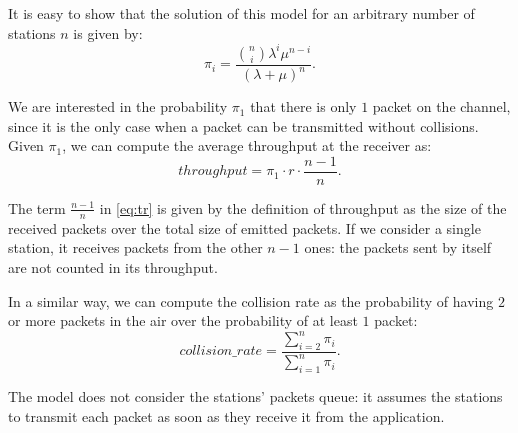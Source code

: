 It is easy to show that the solution of this model for an arbitrary number of stations $n$ is given by:
\begin{equation*}
    \pi_i = \frac{\binom{n}{i} \lambda^i \mu^{n-i}}{(\lambda + \mu)^n}.
\end{equation*}

We are interested in the probability $\pi_1$ that there is only $1$ packet on the channel, since it is the only case when a packet can be transmitted without collisions.
Given $\pi_1$, we can compute the average throughput at the receiver as:
\begin{equation}
    throughput = \pi_1 \cdot r \cdot \frac{n-1}{n}.
    \label{eq:tr}
\end{equation}

The term $\frac{n-1}{n}$ in \cref{eq:tr} is given by the definition of throughput as the size of the received packets over the total size of emitted packets.
If we consider a single station, it receives packets from the other $n-1$ ones: the packets sent by itself are not counted in its throughput.

In a similar way, we can compute the collision rate as the probability of having $2$ or more packets in the air over the probability of at least $1$ packet:
\begin{equation}
    collision\_rate = \frac{\sum_{i = 2}^{n} \pi_i}{\sum_{i = 1}^{n} \pi_i}.
\end{equation}

The model does not consider the stations' packets queue: it assumes the stations to transmit each packet as soon as they receive it from the application.
